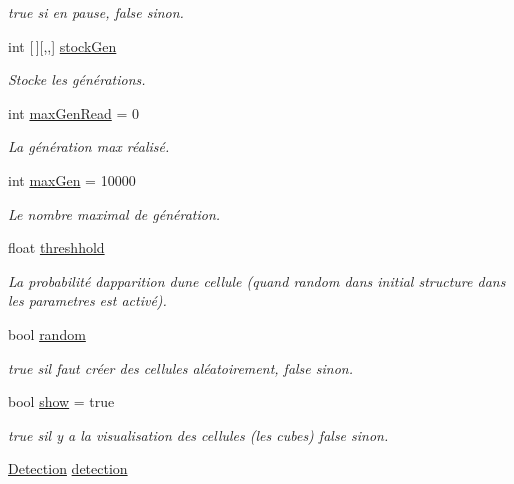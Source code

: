 \begin{DoxyCompactItemize}
\begin{DoxyCompactList}\small\item\em true si en pause, false sinon. \end{DoxyCompactList}\item 
int \mbox{[}$\,$\mbox{]}\mbox{[},,\mbox{]} \mbox{\hyperlink{class_simulation_adab3e6e037fe4694b0f6f990ac4497f9}{stock\+Gen}}
\begin{DoxyCompactList}\small\item\em Stocke les générations. \end{DoxyCompactList}\item 
int \mbox{\hyperlink{class_simulation_ad4dd940ecc0d68275e9db930991494ee}{max\+Gen\+Read}} = 0
\begin{DoxyCompactList}\small\item\em La génération max réalisé. \end{DoxyCompactList}\item 
int \mbox{\hyperlink{class_simulation_ace7b43c186833b6babd2f131eb705ebb}{max\+Gen}} = 10000
\begin{DoxyCompactList}\small\item\em Le nombre maximal de génération. \end{DoxyCompactList}\item 
float \mbox{\hyperlink{class_simulation_a6ea09f230373dac17ac214fd287b697f}{threshhold}}
\begin{DoxyCompactList}\small\item\em La probabilité d\textquotesingle{}apparition d\textquotesingle{}une cellule (quand random dans initial structure dans les parametres est activé). \end{DoxyCompactList}\item 
bool \mbox{\hyperlink{class_simulation_aedb9a065e068f5a643f6cb40b82942da}{random}}
\begin{DoxyCompactList}\small\item\em true s\textquotesingle{}il faut créer des cellules aléatoirement, false sinon. \end{DoxyCompactList}\item 
bool \mbox{\hyperlink{class_simulation_ae9871215c90d09d1137f2332762dbbac}{show}} = true
\begin{DoxyCompactList}\small\item\em true s\textquotesingle{}il y a la visualisation des cellules (les cubes) false sinon. \end{DoxyCompactList}\item 
\mbox{\hyperlink{class_detection}{Detection}} \mbox{\hyperlink{class_simulation_afc9e01cae93b73b18dff79aa690b20ee}{detection}}

\end{DoxyCompactItemize}
